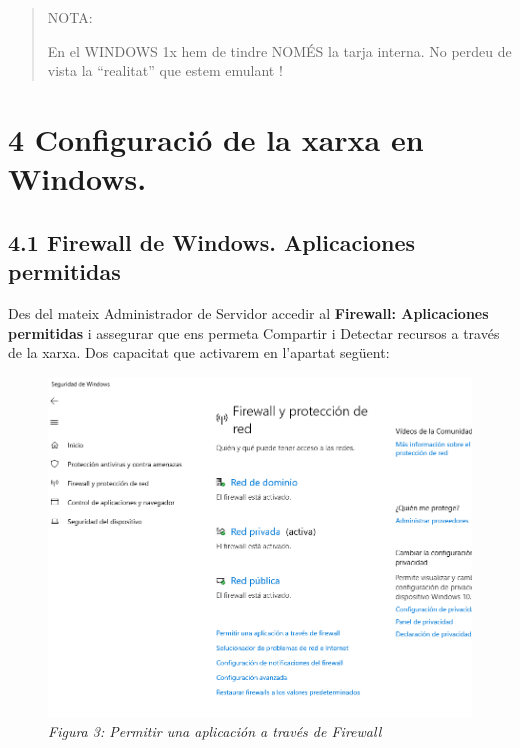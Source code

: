 \documentclass[
  a4paper,
]{article}
\begin{document}
\begin{quote}
NOTA:

En el WINDOWS 1x hem de tindre NOMÉS la tarja interna. No perdeu de
vista la ``realitat'' que estem emulant !
\end{quote}

\section{4 Configuració de la xarxa en
Windows.}\label{configuraciuxf3-de-la-xarxa-en-windows.}

\subsection{4.1 Firewall de Windows. Aplicaciones
permitidas}\label{firewall-de-windows.-aplicaciones-permitidas}

Des del mateix Administrador de Servidor accedir al \textbf{Firewall:
Aplicaciones permitidas} i assegurar que ens permeta Compartir i
Detectar recursos a través de la xarxa. Dos capacitat que activarem en
l'apartat següent:

\begin{figure}
\centering
\includegraphics{png/ADDS/PermitirUnaAplicacionATravesdeFirewall.png}
\caption{\emph{Figura 3: Permitir una aplicación a través de Firewall}}
\end{figure}
\end{document}

